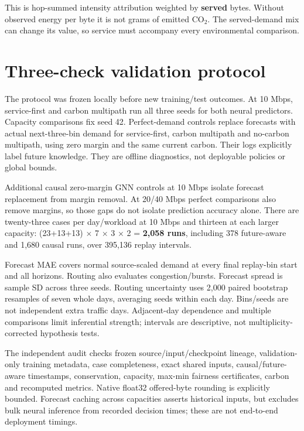 \documentclass[conference,letterpaper]{IEEEtran}
\begin{document}
This is hop-summed intensity attribution weighted by \textbf{served} bytes. Without observed energy per byte it is not grams of emitted CO$_2$. The served-demand mix can change its value, so service must accompany every environmental comparison.

\section{Three-check validation protocol}

The protocol was frozen locally before new training/test outcomes. At 10 Mbps, service-first and carbon multipath run all three seeds for both neural predictors. Capacity comparisons fix seed 42. Perfect-demand controls replace forecasts with actual next-three-bin demand for service-first, carbon multipath and no-carbon multipath, using zero margin and the same current carbon. Their logs explicitly label future knowledge. They are offline diagnostics, not deployable policies or global bounds.

Additional causal zero-margin GNN controls at 10 Mbps isolate forecast replacement from margin removal. At 20/40 Mbps perfect comparisons also remove margins, so those gaps do not isolate prediction accuracy alone. There are twenty-three cases per day/workload at 10 Mbps and thirteen at each larger capacity: (23+13+13) $\times$ 7 $\times$ 3 $\times$ 2 = \textbf{2,058 runs}, including 378 future-aware and 1,680 causal runs, over 395,136 replay intervals.

Forecast MAE covers normal source-scaled demand at every final replay-bin start and all horizons. Routing also evaluates congestion/bursts. Forecast spread is sample SD across three seeds. Routing uncertainty uses 2,000 paired bootstrap resamples of seven whole days, averaging seeds within each day. Bins/seeds are not independent extra traffic days. Adjacent-day dependence and multiple comparisons limit inferential strength; intervals are descriptive, not multiplicity-corrected hypothesis tests.

The independent audit checks frozen source/input/checkpoint lineage, validation-only training metadata, case completeness, exact shared inputs, causal/future-aware timestamps, conservation, capacity, max-min fairness certificates, carbon and recomputed metrics. Native float32 offered-byte rounding is explicitly bounded. Forecast caching across capacities asserts historical inputs, but excludes bulk neural inference from recorded decision times; these are not end-to-end deployment timings.
\end{document}
